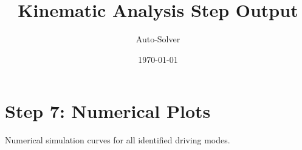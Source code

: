 \documentclass[12pt, a4paper]{article}
\title{\textbf{Kinematic Analysis Step Output}}
\author{Auto-Solver}
\date{\today}
\begin{document}
\maketitle
\section*{Step 7: Numerical Plots}
Numerical simulation curves for all identified driving modes.
\end{document}
